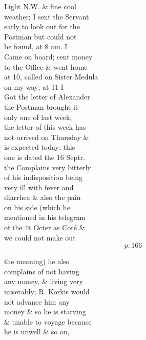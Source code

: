 \documentclass{report}
\begin{document}
	\par{
 	Light N.W. \& fine cool\ \\weather; I sent the Servant\ \\early to look out for the\ \\Postman but could not\ \\be found, at 8 am. I\ \\Came on board; sent money\ \\to the Office \& went home\ \\at 10, called on Sister Medula\ \\on my way; at 11 I\ \\Got the letter of Alexander\ \\the Postman brought it\ \\only one of last week,\ \\the letter of this week has\ \\not arrived on Thursday \&\ \\is expected today; this\ \\one is dated the 16 Septr.\ \\the Complains very bitterly\ \\of his indisposition being\ \\very ill with fever and\ \\diarrhea \& also the pain\ \\on his side (which he\ \\mentioned in his telegram\ \\of the 4t Octer as Coté \&\ \\we could not make out\ \\
  \[p: 166 \]

	}




	\par{
 	the meaning) he also\ \\complains of not having\ \\any money, \& living very\ \\miserably; R. Korkis would\ \\not advance him any\ \\money \& so he is starving\ \\\& unable to voyage because\ \\he is unwell \& so on,\ \\
	}
\end{document}
